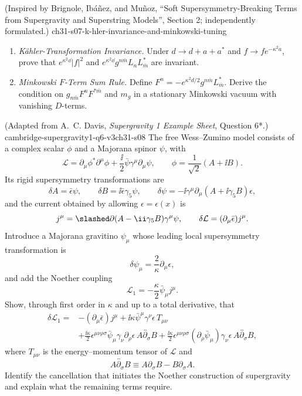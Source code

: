 \begin{enumerate}
    {(Inspired by Brignole, Ib\'a\~nez, and Mu\~noz, ``Soft Supersymmetry-Breaking Terms from Supergravity and Superstring Models'', Section 2; independently formulated.)}
    {ch31-s07-k-hler-invariance-and-minkowski-tuning}
  \begin{enumerate}
    \item \emph{Kähler-Transformation Invariance.}
    Under
      \(d\to d+a+a^*\) and \(f\to fe^{-\kappa^2a}\), prove that
      \(e^{\kappa^2\dd}|f|^2\) and
      \(e^{\kappa^2\dd}g^{n\bar m}L_nL_{\bar m}^*\) are invariant.
    \item \emph{Minkowski \(F\)-Term Sum Rule.}
    Define
      \(F^n=-e^{\kappa^2d/2}g^{n\bar m}L_{\bar m}^*\).
      Derive the condition on \(g_{n\bar m}F^nF^{*\bar m}\) and \(m_g\)
      in a stationary Minkowski vacuum with vanishing \(D\)-terms.
  \end{enumerate}

    {(Adapted from A.~C. Davis, \emph{Supergravity 1 Example Sheet},
      Question 6*.)}
    {cambridge-supergravity1-q6-v3ch31-s08}
  The free Wess--Zumino model consists of a complex scalar \(\phi\) and a
  Majorana spinor \(\psi\), with
  \[
    \mathcal L
      =\partial_\mu\phi^*\partial^\mu\phi
       +\frac{\ii}{2}\bar\psi\gamma^\mu\partial_\mu\psi,
    \qquad
    \phi=\frac{1}{\sqrt2}(A+\ii B).
  \]
  Its rigid supersymmetry transformations are
  \[
    \delta A=\bar\epsilon\psi,
    \qquad
    \delta B=\ii\bar\epsilon\gamma_5\psi,
    \qquad
    \delta\psi=-\ii\gamma^\mu\partial_\mu(A+\ii\gamma_5B)\epsilon,
  \]
  and the current obtained by allowing \(\epsilon=\epsilon(x)\) is
  \[
    j^\mu=\slashed\partial(A-\ii\gamma_5B)\gamma^\mu\psi,
    \qquad
    \delta\mathcal L=(\partial_\mu\bar\epsilon)j^\mu .
  \]
  Introduce a Majorana gravitino \(\psi_\mu\) whose leading local
  supersymmetry transformation is
  \[
    \delta\psi_\mu=\frac{2}{\kappa}\partial_\mu\epsilon,
  \]
  and add the Noether coupling
  \[
    \mathcal L_1=-\frac{\kappa}{2}\bar\psi_\mu j^\mu.
  \]
  Show, through first order in \(\kappa\) and up to a total derivative,
  that
  \[
  \begin{split}
    \delta\mathcal L_1={}&-(\partial_\mu\bar\epsilon)j^\mu
      +\ii\kappa\bar\psi^\mu\gamma^\nu\epsilon\,T_{\mu\nu}\\
      &+\frac{\ii\kappa}{2}\epsilon^{\mu\nu\rho\sigma}
        \bar\psi_\mu\gamma_\nu\partial_\rho\epsilon\,
        A\overleftrightarrow{\partial_\sigma}B
      +\frac{\ii\kappa}{2}\epsilon^{\mu\nu\rho\sigma}
        (\partial_\rho\bar\psi_\mu)\gamma_\nu\epsilon\,
        A\overleftrightarrow{\partial_\sigma}B,
  \end{split}
  \]
  where \(T_{\mu\nu}\) is the energy--momentum tensor of \(\mathcal L\) and
  \[
    A\overleftrightarrow{\partial_\sigma}B
      \equiv A\partial_\sigma B-B\partial_\sigma A.
  \]
  Identify the cancellation that initiates the Noether construction of
  supergravity and explain what the remaining terms require.


\end{enumerate}
